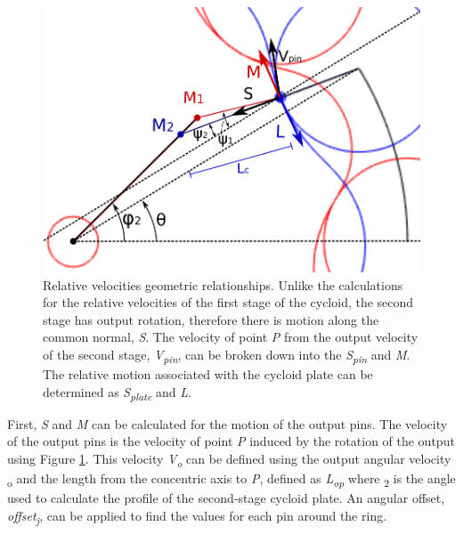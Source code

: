 \begin{figure}[!b]
	\centering
	\includegraphics[width=0.70\linewidth]{fig/two_stage_vel_angles}
   \caption{Relative velocities geometric relationships. Unlike the calculations for the relative velocities of the first stage of the cycloid, the second stage has output rotation, therefore there is motion along the common normal, \textit{S}. The velocity of point \textit{P} from the output velocity of the second stage, \textit{V\textsubscript{pin}}, can be broken down into the \textit{S\textsubscript{pin}} and \textit{M}. The relative motion associated with the cycloid plate can be determined as \textit{S\textsubscript{plate}} and \textit{L}.}
   \label{fig:dual_relative_motion}
\end{figure}

First, \textit{S} and \textit{M} can be calculated for the motion of the output pins. The velocity of the output pins is the velocity of point \textit{P} induced by the rotation of the output using Figure \ref{fig:dual_relative_motion}. This velocity \textit{V\textsubscript{o}} can be defined using the output angular velocity \textomega\textsubscript{o} and the length from the concentric axis to \textit{P}, defined as \textit{L\textsubscript{op}} where \textpsi\textsubscript{2} is the angle used to calculate the profile of the second-stage cycloid plate. An angular offset, \textit{offset\textsubscript{j}}, can be applied to find the values for each pin around the ring. 

